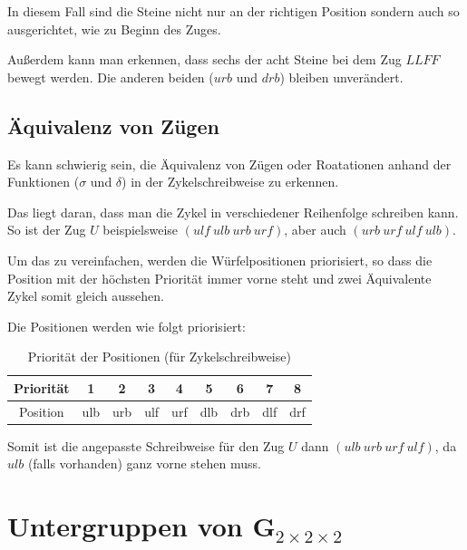 \documentclass[12pt,a4paper, usenames, dvipsnames]{article}
\begin{document}
In diesem Fall sind die Steine nicht nur an der richtigen Position sondern auch so ausgerichtet, wie zu Beginn des Zuges. 


Außerdem kann man erkennen, dass sechs der acht Steine bei dem Zug $LLFF$ bewegt werden. Die anderen beiden ($urb$ und $drb$) bleiben unverändert. 

%
%
%
%
%
%
%
%
%
%
%
%
%
%
%
%
%
%
%
%
\subsection*{Äquivalenz von Zügen}


Es kann schwierig sein, die Äquivalenz von Zügen oder Roatationen anhand der Funktionen ($\sigma$ und $\delta$) in der Zykelschreibweise zu erkennen. 


Das liegt daran, dass man die Zykel in verschiedener Reihenfolge schreiben kann. So ist der Zug $U$ beispielsweise $ (ulf \ ulb \ urb \ urf)$, aber auch $(urb \ urf \ ulf \ ulb)$.


Um das zu vereinfachen, werden die Würfelpositionen priorisiert, so dass die Position mit der höchsten Priorität immer vorne steht und zwei Äquivalente Zykel somit gleich aussehen. 

Die Positionen werden wie folgt priorisiert:
\begin{table}[H]
\centering
\begin{tabular}{|c||c|c|c|c|c|c|c|c|}
\hline
Priorität & 1 & 2 & 3 & 4 & 5 & 6 & 7 & 8 \\
\hline
Position  & ulb & urb & ulf & urf & dlb & drb & dlf & drf \\
\hline
\end{tabular}
\caption[Priorität der Positionen (für Zykelschreibweise)]{Priorität der Positionen (für Zykelschreibweise)}
\end{table}
Somit ist die angepasste Schreibweise für den Zug $U$ dann $(ulb \ urb \ urf \ ulf)$, da $ulb$ (falls vorhanden) ganz vorne stehen muss.

%
%
%
%
%
%
%
%
%
%
%
%
%
%
%
%
%
%
%
%
\newpage

\section{Untergruppen von G$_{2\times 2\times 2}$}
\end{document}
